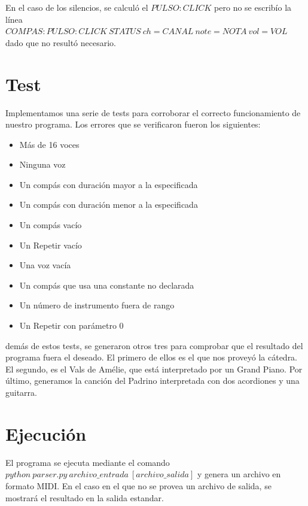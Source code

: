\documentclass[a4paper, 10pt, twoside]{article}
\begin{document}
En el caso de los silencios, se calculó el $PULSO:CLICK$ pero no se escribío la línea $COMPAS:PULSO:CLICK\ STATUS\ ch=CANAL\ note=NOTA\ vol=VOL$ dado que no resultó necesario.

\newpage


\section{Test}
Implementamos una serie de tests para corroborar el correcto funcionamiento de nuestro programa. Los errores que se verificaron fueron los siguientes:

\begin{itemize}
\item Más de 16 voces
\item Ninguna voz
\item Un compás con duración mayor a la especificada
\item Un compás con duración menor a la especificada
\item Un compás vacío 
\item Un Repetir vacío
\item Una voz vacía 
\item Un compás que usa una constante no declarada
\item Un número de instrumento fuera de rango
\item Un Repetir con parámetro 0

\end{itemize}
demás de estos tests, se generaron otros tres para comprobar que el resultado del programa fuera el deseado. El primero de ellos es el que nos proveyó la cátedra. El segundo, es el Vals de Amélie, que está interpretado por un Grand Piano. Por último, generamos la canción del Padrino interpretada con dos acordiones y una guitarra.



\section{Ejecución}
El programa se ejecuta mediante el comando $python\ parser.py\ archivo\_entrada\ [archivo\_salida]$ y genera un archivo en formato MIDI. En el caso en el que no se provea un archivo de salida, se mostrará el resultado en la salida estandar. 
\end{document}
